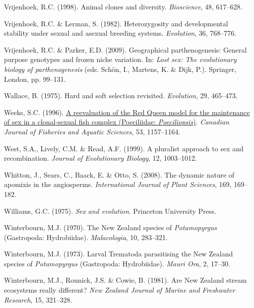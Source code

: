 \documentclass[
  letterpaper,
]{book}
\newlength{\cslhangindent}
\newenvironment{CSLReferences}[2] %
 {\begin{list}{}{%
  \setlength{\itemindent}{0pt}
  \setlength{\leftmargin}{0pt}
  \setlength{\parsep}{0pt}
  \ifodd #1
   \setlength{\leftmargin}{\cslhangindent}
   \setlength{\itemindent}{-1\cslhangindent}
  \fi
  \setlength{\itemsep}{#2\baselineskip}}}
 {\end{list}}
\begin{document}
\begin{CSLReferences}{1}{0}
Vrijenhoek, R.C. (1998). Animal clones and diversity. \emph{Bioscience},
48, 617--628.

Vrijenhoek, R.C. \& Lerman, S. (1982). Heterozygosity and developmental
stability under sexual and asexual breeding systems. \emph{Evolution},
36, 768--776.

Vrijenhoek, R.C. \& Parker, E.D. (2009). Geographical parthenogenesis:
General purpose genotypes and frozen niche variation. In: \emph{Lost
sex: The evolutionary biology of parthenogenesis} (eds. Schön, I.,
Martens, K. \& Dijk, P.). Springer, London, pp. 99--131.

Wallace, B. (1975). Hard and soft selection revisited. \emph{Evolution},
29, 465--473.

Weeks, S.C. (1996). \href{https://doi.org/10.1139/f96-041}{A
reevaluation of the {Red Queen} model for the maintenance of sex in a
clonal-sexual fish complex ({Poeciliidae}: \emph{{P}oeciliopsis})}.
\emph{Canadian Journal of Fisheries and Aquatic Sciences}, 53,
1157--1164.

West, S.A., Lively, C.M. \& Read, A.F. (1999). A pluralist approach to
sex and recombination. \emph{Journal of Evolutionary Biology}, 12,
1003--1012.

Whitton, J., Sears, C., Baack, E. \& Otto, S. (2008). The dynamic nature
of apomixis in the angiosperms. \emph{International Journal of Plant
Sciences}, 169, 169--182.

Williams, G.C. (1975). \emph{Sex and evolution}. Princeton University
Press.

Winterbourn, M.J. (1970). The {New Zealand} species of
\emph{{P}otamopyrgus} ({G}astropoda: {H}ydrobiidae). \emph{Malacologia},
10, 283--321.

Winterbourn, M.J. (1973). Larval {Trematoda} parasitising the {New
Zealand} species of \emph{{P}otamopyrgus} ({G}astropoda: {H}ydrobiidae).
\emph{Mauri Ora}, 2, 17--30.

Winterbourn, M.J., Rounick, J.S. \& Cowie, B. (1981). Are {New Zealand}
stream ecosystems really different? \emph{New Zealand Journal of Marine
and Freshwater Research}, 15, 321--328.

\end{CSLReferences}


\backmatter
\end{document}
